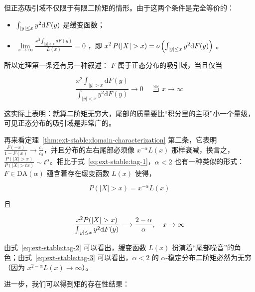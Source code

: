 但正态吸引域不仅限于有限二阶矩的情形。由于这两个条件是完全等价的：

\begin{itemize}
\tightlist
\item
  $\int_{|y| \le x} y^2 {\rm d}F(y)$ 是缓变函数；
\item
  $\lim\limits_{x\to\infty}\frac{x^2\int_{|y|>x}dF(y)}{L(x)} = 0$ ，即 $x^2\,P(|X|>x) = o\left(\int_{|y| \le x} y^2 {\rm d}F(y) \right)$ 。
\end{itemize}

所以定理第一条还有另一种叙述： $F$ 属于正态分布的吸引域，当且仅当

\begin{equation}
\label{eq:ext-stable:tag-1}
\frac{x^2\int_{|y|>x}\mathrm{d}F(y)}{\int_{|y|<x}y^2\mathrm{d}F(y)}\to 0\quad \text{ 当 }x\to\infty
\end{equation}

这实际上表明：就算二阶矩无穷大，尾部的质量要比``积分里的主项''小一个量级，可见正态分布的吸引域是非常广的。

再来看定理~\ref{thm:ext-stable:domain-characterization} 第二条，它表明 $\frac{F(-x)}{1-F(x)}\to \frac{c_1}{c_2}$，并且分布的左右尾部必须像 $x^{-\alpha}L(x)$ 那样衰减，换言之，$\frac{P(|X|>x)}{P(|X|>tx)}\sim t^\alpha$。相比于式~\eqref{eq:ext-stable:tag-1}，$\alpha<2$ 也有一种类似的形式：$F\in\mathrm{DA}(\alpha)$ 蕴含着存在缓变函数 $L(x)$ 使得，

\begin{equation}
\label{eq:ext-stable:tag-2}
P(|X|>x)=x^{-\alpha}L(x)
\end{equation}

且

\begin{equation}
\label{eq:ext-stable:tag-3}
\frac{x^2 P(|X| > x)}{\int_{|y|\le x} y^2 {\rm d}F(y)} \longrightarrow \frac{2 - \alpha}{\alpha}, \quad x \to \infty
\end{equation}

由式~\eqref{eq:ext-stable:tag-2} 可以看出，缓变函数 $L(x)$ 扮演着``尾部噪音''的角色；由式~\eqref{eq:ext-stable:tag-3} 可以看出，$\alpha<2$ 的 $\alpha$-稳定分布二阶矩必然为无穷（因为 $x^{2-\alpha}L(x)\to\infty$）。

进一步，我们可以得到矩的存在性结果：

